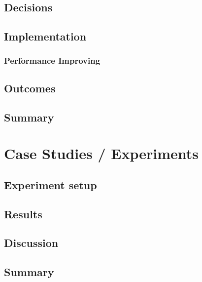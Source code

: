 \documentclass[
  twoside,
  11pt, a4paper,
  footinclude=true,
  headinclude=true,
  cleardoublepage=empty
]{scrbook}
\begin{document}
    \section{Decisions} \label{development:decisions}

    \section{Implementation} \label{development:implementation}

      \subsection{Performance Improving} \label{development:implementation:performance}

    \section{Outcomes} \label{development:outcomes}

    \section{Summary} \label{development:summary}

  \chapter{Case Studies / Experiments} \label{experiments}

    \section{Experiment setup} \label{experiments:tests}

    \section{Results} \label{experiments:results}

    \section{Discussion} \label{experiments:discussion}

    \section{Summary} \label{experiments:summary}
\end{document}

